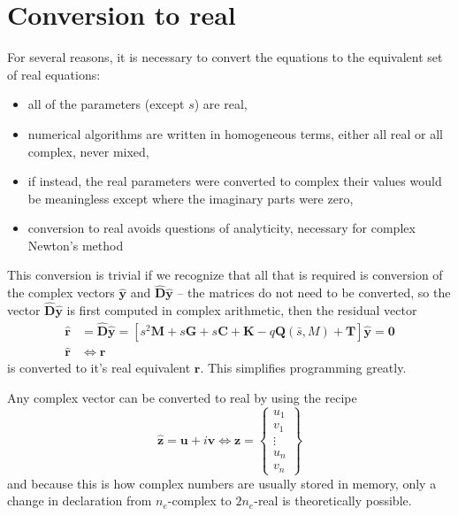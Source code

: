 \documentclass[10pt,openany,twoside]{book}
\numberwithin{equation}{section}   %
\newcommand{\Matrix}[1]{\boldsymbol{#1}}
\newcommand{\Vector}[1]{\boldsymbol{#1}}
\begin{document}
\section{Conversion to real}\label{sect:real-conversion}
For several reasons, it is necessary to convert the equations to the
equivalent set of real equations:
\begin{itemize}
	\item all of the parameters (except $s$) are real,
	\item numerical algorithms are written in homogeneous terms,
		either all real or all complex, never mixed,
	\item if instead, the real parameters were converted to complex
		their values would be meaningless except where the imaginary parts
		were zero,
	\item conversion to real avoids questions of analyticity, necessary
		for complex Newton's method
\end{itemize}
This conversion is trivial if we recognize that all that is required
is conversion of the complex vectors $\Vector{\hat{y}}$ and $\Vector{\hat{D}\hat{y}}$
-- the matrices do not need to be converted, so the vector $\Vector{\hat{D}\hat{y}}$
is first computed in complex arithmetic, then the residual vector
\begin{align}\label{eqn:residual}
	\hat{\Vector{r}} &= \Vector{\hat{D}\hat{y}}
		= \left[ s^2 \Matrix{M} + s \Matrix{G} + s \Matrix{C} +
			 \Matrix{K} - q \Matrix{Q} (\bar{s},M)
			 + \Matrix{T} \right] \hat{\Vector{y}} = \Vector{0} \nonumber \\
	\hat{\Vector{r}} &\Leftrightarrow \Vector{r}
\end{align}
is converted to it's real equivalent $\Vector{r}$. This simplifies programming greatly.

Any complex vector can be converted to real by using the recipe
\begin{equation}\label{eqn:real-conversion}
\Vector{\hat{z}} = \Vector{u} + i\Vector{v}
	\Leftrightarrow \Vector{z} = \left\{ \begin{array}{c}
			u_1 \\
			v_1 \\
			\vdots \\
			u_{n} \\
			v_{n}
		\end{array} \right\}
\end{equation}
and because this is how complex numbers are usually stored in memory, only
a change in declaration from $n_e$-complex to $2n_e$-real is
theoretically possible.
\end{document}
